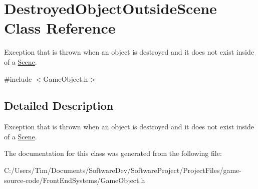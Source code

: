 \hypertarget{class_destroyed_object_outside_scene}{}\section{Destroyed\+Object\+Outside\+Scene Class Reference}
\label{class_destroyed_object_outside_scene}


Exception that is thrown when an object is destroyed and it does not exist inside of a \hyperlink{class_scene}{Scene}.  




{\ttfamily \#include $<$Game\+Object.\+h$>$}



\subsection{Detailed Description}
Exception that is thrown when an object is destroyed and it does not exist inside of a \hyperlink{class_scene}{Scene}. 

The documentation for this class was generated from the following file\+:\begin{DoxyCompactItemize}
\item 
C\+:/\+Users/\+Tim/\+Documents/\+Software\+Dev/\+Software\+Project/\+Project\+Files/game-\/source-\/code/\+Front\+End\+Systems/Game\+Object.\+h\end{DoxyCompactItemize}

